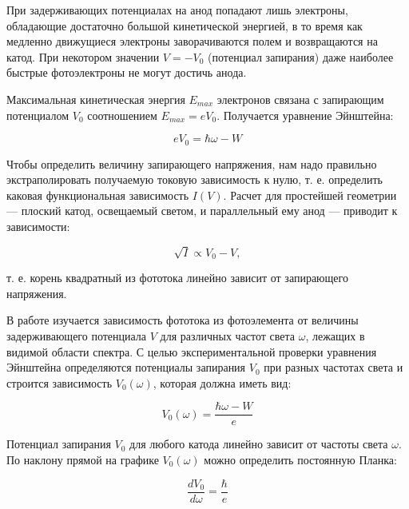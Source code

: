 \documentclass[a4paper, 12pt]{article}%
\begin{document}
	При задерживающих потенциалах на анод попадают лишь электроны,  обладающие достаточно большой кинетической энергией,  в то время как медленно движущиеся электроны заворачиваются полем и возвращаются на катод.  При некотором значении $ V = -V_0 $ (потенциал запирания) даже наиболее быстрые фотоэлектроны не могут достичь анода.
	
	Максимальная кинетическая энергия $ E_{max} $ электронов связана с запирающим потенциалом $V_0$ соотношением $ E_{max} = eV_0$.  Получается уравнение Эйнштейна:
	
\[eV_0 = \hbar\omega - W\]
	
	Чтобы определить величину запирающего напряжения,  нам надо правильно экстраполировать получаемую токовую зависимость к нулю,  т. е. определить каковая функциональная зависимость $I(V)$.  Расчет для простейшей геометрии --- плоский катод, освещаемый светом, и параллельный ему анод --- приводит к зависимости:
	
\[\sqrt{I} \propto V_0 - V,\]
	
т. е. корень квадратный из фототока линейно зависит от запирающего напряжения.  
	
	В работе изучается зависимость фототока из фотоэлемента от величины задерживающего потенциала $V$ для различных частот света $\omega$,  лежащих в видимой области спектра. С целью экспериментальной проверки уравнения Эйнштейна определяются потенциалы запирания $V_0$ при разных частотах света и строится зависимость $ V_0(\omega)$,  которая должна иметь вид:
	
\[V_0 (\omega) = \dfrac{\hbar\omega - W}{e}\]
		
	Потенциал запирания $V_0$ для любого катода линейно зависит от частоты света $\omega$.  По наклону прямой на графике $V_0(\omega)$ можно определить постоянную Планка:
	
\[\dfrac{dV_0}{d\omega} = \dfrac{\hbar}{e}\]
\end{document}
